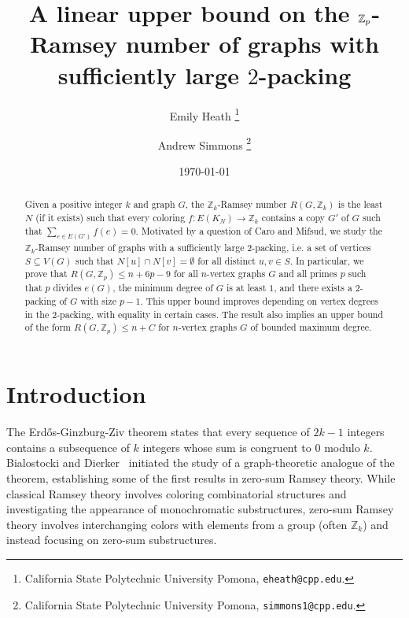 \documentclass[11pt]{article}
\title{A linear upper bound on the $\bZ_p$-Ramsey number of graphs with sufficiently large $2$-packing}
\author{Emily Heath \footnote{California State Polytechnic University Pomona, \texttt{eheath@cpp.edu}.} 
\and 
Andrew Simmons \footnote{California State Polytechnic University Pomona, \texttt{simmons1@cpp.edu}.}}
\date{\today}
\newcommand{\bZ}{\mathbb{Z}}
\theoremstyle{definition}
\theoremstyle{plain}
\begin{document}
\maketitle

\begin{abstract}
Given a positive integer $k$ and graph $G$,  the $\mathbb{Z}_k$-Ramsey number $R(G,\bZ_k)$ is the least $N$ (if it exists) such that every coloring $f:E(K_N)\rightarrow \mathbb{Z}_k$ contains a copy $G'$ of $G$ such that $\sum_{e\in E(G')}f(e)=0$. 
Motivated by a question of Caro and Mifsud, we study the $\mathbb{Z}_k$-Ramsey number of graphs with a sufficiently large 2-packing, i.e. a set of vertices $S\subseteq V(G)$ such that $N[u]\cap N[v]=\emptyset$ for all distinct $u,v\in S$. In particular, we prove that $R(G,\mathbb{Z}_p)\leq n+6p-9$ for all $n$-vertex graphs $G$ and all primes $p$ such that $p$ divides $e(G)$, the minimum degree of $G$ is at least $1$, and there exists a $2$-packing of $G$ with size $p-1$. 
This upper bound improves depending on vertex degrees in the $2$-packing, with equality in certain cases. The result also implies an upper bound of the form $R(G,\mathbb{Z}_p)\leq n+C$ for $n$-vertex graphs $G$ of bounded maximum degree.

\end{abstract}

\section{Introduction}
The Erd\H{o}s-Ginzburg-Ziv theorem states that every sequence of $2k-1$ integers contains a subsequence of $k$ integers whose sum is congruent to $0$ modulo $k$. Bialostocki and Dierker~\cite{bialostocki1990zero} initiated the study of a graph-theoretic analogue of the theorem, establishing some of the first results in zero-sum Ramsey theory. While classical Ramsey theory involves coloring combinatorial structures and investigating the appearance of monochromatic substructures, zero-sum Ramsey theory involves interchanging colors with elements from a group (often $\bZ_k$) and instead focusing on zero-sum substructures.
\end{document}
